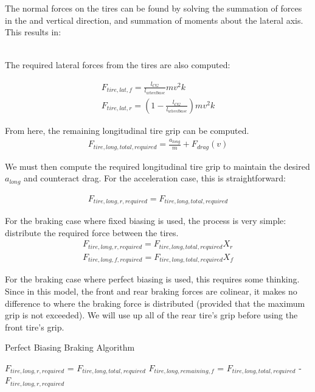 \documentclass{article}
\begin{document}
The normal forces on the tires can be found by solving the summation of forces in the and vertical direction, and summation of moments about the lateral axis. This results in:

\begin{align}
\end{align}

The required lateral forces from the tires are also computed:

\begin{align}
	F_{tire,lat,f} = \frac{l_{CG}}{l_{wheelbase}} m v^2 k \\ 
	F_{tire,lat,r} = (1-\frac{l_{CG}}{l_{wheelbase}}) m v^2 k
\end{align}

From here, the remaining longitudinal tire grip can be computed.
\begin{align}
	F_{tire,long,total,required} = \frac{a_{long}}{m} + F_{drag}(v)
\end{align}

We must then compute the required longitudinal tire grip to maintain the desired $a_{long}$ and counteract drag. For the acceleration case, this is straightforward:

\begin{align}
	F_{tire,long,r,required} = F_{tire,long,total,required}
\end{align}

For the braking case where fixed biasing is used, the process is very simple: distribute the required force between the tires.
\begin{align}
	F_{tire,long,r,required} = F_{tire,long,total,required} X_r \\
	F_{tire,long,f,required} = F_{tire,long,total,required} X_f
\end{align}

For the braking case where perfect biasing is used, this requires some thinking. Since in this model, the front and rear braking forces are colinear, it makes no difference to where the braking force is distributed (provided that the maximum grip is not exceeded). We will use up all of the rear tire's grip before using the front tire's grip.

\begin{algorithm}[H]
\caption{Perfect Biasing Braking Algorithm}
\begin{algorithmic}[1]
	\State $F_{tire,long,r,required}$ = $F_{tire,long,total,required}$
	\State	$F_{tire,long,remaining,f}$ = $F_{tire,long,total,required}$ - $F_{tire,long,r,required}$
	\EndIf
\end{algorithmic}
\end{algorithm}
\end{document}
